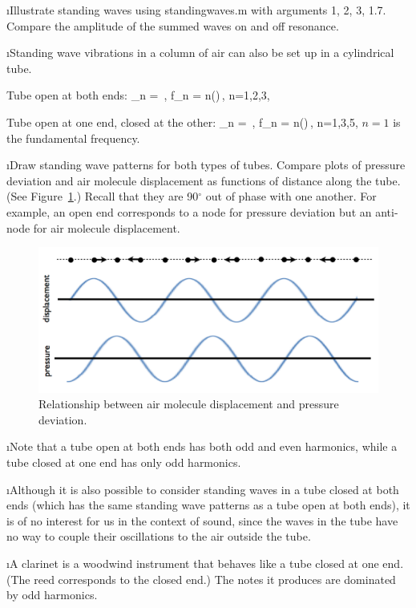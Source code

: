 \i \demo Illustrate standing waves using standingwaves.m
with arguments 1, 2, 3, 1.7.
Compare the amplitude of the summed waves on and off resonance.

\i Standing wave vibrations in a column of air
can also be set up in a cylindrical tube.

Tube open at both ends:
%
\be
\lambda_n = \,,
\quad
f_n = n\left(\right)\,,
\quad n=1,2,3, \cdots
\ee
%

Tube open at one end, closed at the other:
%
\be
\lambda_n = \,,
\quad
f_n = n\left(\right)\,,
\quad n=1,3,5, \cdots
\ee
$n=1$ is the fundamental frequency.

\i Draw standing wave patterns for both types of
tubes.
Compare plots of pressure deviation and air molecule
displacement as functions of distance along the tube.
(See Figure~\ref{f:displacement-pressure}.)
Recall that they are 90$^\circ$ out of phase with one another.
For example, an open end corresponds to a node for 
pressure deviation but an anti-node for air molecule displacement.
%
\begin{figure}[htbp]
  \begin{center}
  \includegraphics[width=.9\textwidth]{displacement-pressure.pdf}
  \caption{Relationship between air molecule displacement and pressure deviation.}
  \label{f:displacement-pressure}
  \end{center}
\end{figure}

\i Note that a tube open at both ends has both odd
and even harmonics, while a tube closed at one 
end has only odd harmonics.

\i Although it is also possible to consider standing 
waves in a tube closed at both ends (which has the 
same standing wave patterns as a
tube open at both ends), it is of no interest for us
in the context of sound, since the waves in the tube
have no way to couple their oscillations to the air
outside the tube.
 
\i \ex A clarinet is a woodwind instrument that 
behaves like a tube closed at one end.
(The reed corresponds to the closed end.)
The notes it produces are dominated by odd harmonics.

